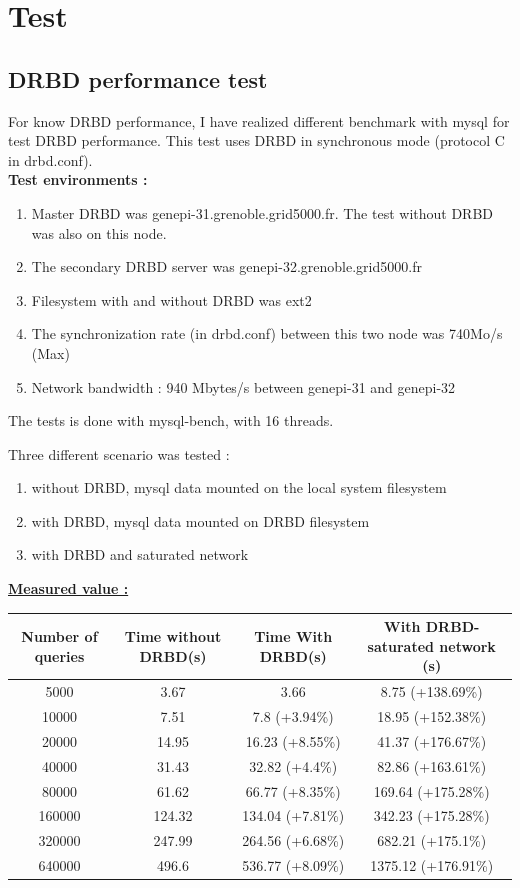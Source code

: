\documentclass[a4paper,10pt]{report}
\begin{document}
\chapter{Test}

\section{DRBD performance test}

For know DRBD performance, I have realized different benchmark with mysql for test DRBD performance. This test uses DRBD in synchronous mode (protocol C in drbd.conf).\\
\textbf{Test environments :}
\begin{enumerate}
 \item Master DRBD was genepi-31.grenoble.grid5000.fr. The test without DRBD was also on this node.
 \item The secondary DRBD server was genepi-32.grenoble.grid5000.fr 
 \item Filesystem with and without DRBD was ext2
 \item The synchronization rate (in drbd.conf) between this two node was 740Mo/s (Max)
 \item Network bandwidth : 940 Mbytes/s between genepi-31 and genepi-32
\end{enumerate}
The tests is done with mysql-bench, with 16 threads.

Three different scenario was tested :
\begin{enumerate}
 \item without DRBD, mysql data mounted on the local system filesystem 
 \item with DRBD, mysql data mounted on DRBD filesystem 
 \item with DRBD and saturated network 
\end{enumerate}

\bigskip 

\underline{\textbf{Measured value :}}\\

\begin{tabular}{|c|c|c|c|}
\hline
Number of queries&Time without DRBD(s)&Time With DRBD(s)&With DRBD-saturated network (s)\\
\hline
5000 & 3.67 & 3.66 & 8.75 (+138.69\%)\\
\hline
10000 & 7.51 & 7.8 (+3.94\%)& 18.95 (+152.38\%)\\
\hline
20000 & 14.95 & 16.23 (+8.55\%)& 41.37 (+176.67\%)\\
\hline
40000 & 31.43 & 32.82 (+4.4\%) & 82.86 (+163.61\%)\\
\hline
80000 & 61.62 & 66.77 (+8.35\%)& 169.64 (+175.28\%)\\
\hline
160000 & 124.32 & 134.04 (+7.81\%)& 342.23 (+175.28\%)\\
\hline
320000 & 247.99 & 264.56 (+6.68\%)& 682.21 (+175.1\%)\\
\hline
640000 & 496.6 & 536.77 (+8.09\%)& 1375.12 (+176.91\%)\\
\hline
\end{tabular}
\end{document}
